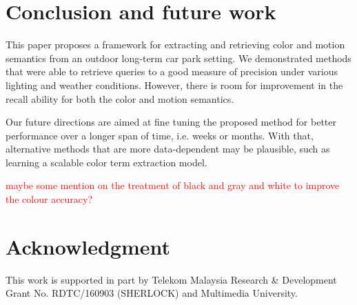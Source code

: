 \documentclass[runningheads]{llncs}
\newcommand{\ian}[1]{\textcolor{red}{#1}}
\newcommand{\ian}[1]{}   %
\begin{document}
\section{Conclusion and future work}
This paper proposes a framework for extracting and retrieving color and motion semantics from an outdoor long-term car park setting. We demonstrated methods that were able to retrieve queries to a good measure of precision under various lighting and weather conditions. However, there is room for improvement in the recall ability for both the color and motion semantics.

Our future directions are aimed at fine tuning the proposed method for better performance over a longer span of time, i.e. weeks or months. With that, alternative methods that are more data-dependent may be plausible, such as learning a scalable color term extraction model. 

\ian{maybe some mention on the treatment of black and gray and white to improve the colour accuracy?}

\section*{Acknowledgment}

This work is supported in part by Telekom Malaysia Research \& Development Grant No. RDTC/160903 (SHERLOCK) and Multimedia University.
%



%
%



%
\end{document}
